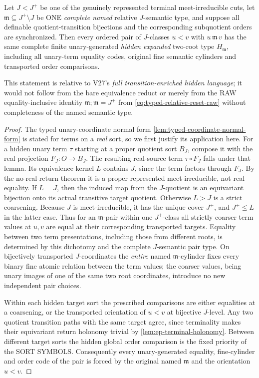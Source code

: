 \begin{lemma}
\label{lem:ep-reset-complete-edge}
Let $J<J^+$ be one of the genuinely represented
terminal meet-irreducible cuts, let
$\mathfrak m\subseteq J^+\setminus J$
be ONE \emph{complete named} relative
$J$-semantic type, and suppose all
definable quotient-transition bijections
and the corresponding subquotient orders
are synchronized. Then every ordered pair
of $J$-classes $u<v$ with
$u\,\mathfrak m\,v$ has the same complete
finite unary-generated \emph{hidden expanded}
two-root type $H_{\mathfrak m}$, including
all unary-term equality codes, original
fine semantic cylinders and transported
order comparisons.

This statement is relative to V27's
\emph{full transition-enriched hidden
language}; it would not follow from the
bare equivalence reduct or merely from
the RAW equality-inclusive identity
\(\mathfrak m;\mathfrak m=J^+\) from
\cref{eq:typed-relative-reset-raw} without completeness
of the named semantic type.
\end{lemma}
\begin{proof}
The typed unary-coordinate normal form
\cref{lem:typed-coordinate-normal-form}
is stated for terms on a \emph{real} sort,
so we first justify its application here.
For a hidden unary term $\tau$ starting at
a proper quotient sort $B_J$, compose it
with the real projection $F_J:O\to B_J$.
The resulting real-source term
$\tau\circ F_J$ falls under that lemma.
Its equivalence kernel $L$ contains $J$,
since the term factors through $F_J$.
By the no-real-return theorem it is a
proper represented meet-irreducible,
not real equality. If $L=J$, then
the induced map from the $J$-quotient
is an equivariant bijection onto its
actual transitive target quotient.
Otherwise $L>J$ is a strict coarsening.
Because $J$ is meet-irreducible, it has the
unique cover $J^+$, and $J^+\le L$ in
the latter case. Thus for an
$\mathfrak m$-pair within one $J^+$-class
all strictly coarser term values at $u,v$
are equal at their corresponding transported
targets. Equality between two term
presentations, including those from
different roots, is determined by this
dichotomy and the complete $J$-semantic
pair type. On bijectively transported
$J$-coordinates the \emph{entire}
named $\mathfrak m$-cylinder fixes every
binary fine atomic relation between the
term values; the coarser values, being
unary images of one of the same two
root coordinates, introduce no new
independent pair choices.

Within each hidden target sort the
prescribed comparisons are either
equalities at a coarsening, or the
transported orientation of $u<v$ at
bijective $J$-level. Any two quotient
transition paths with the same target
agree, since terminality makes their
equivariant return holonomy trivial by
\cref{lem:ep-terminal-holonomy}. Between
different target sorts the hidden global
order comparison is the fixed priority
of the SORT SYMBOLS. Consequently every
unary-generated equality, fine-cylinder
and order code of the pair is forced by
the original named $\mathfrak m$ and
the orientation $u<v$.
\end{proof}

